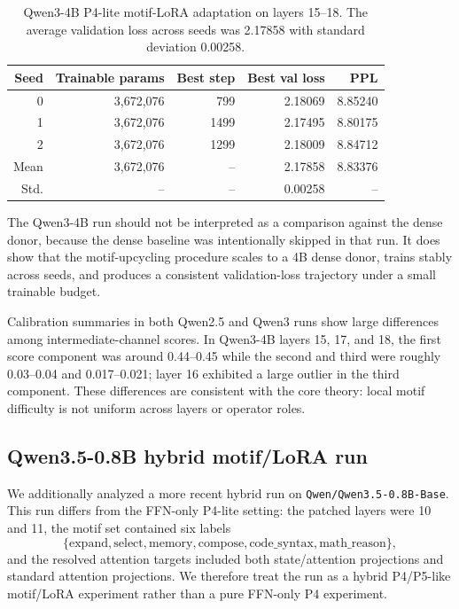 \documentclass[11pt]{article}
\theoremstyle{definition}
\begin{document}
\begin{table}[h]
\centering
\small
\begin{tabular}{rrrrr}
\toprule
Seed & Trainable params & Best step & Best val loss & PPL \\
\midrule
0 & 3,672,076 & 799 & 2.18069 & 8.85240 \\
1 & 3,672,076 & 1499 & 2.17495 & 8.80175 \\
2 & 3,672,076 & 1299 & 2.18009 & 8.84712 \\
\midrule
Mean & 3,672,076 & -- & 2.17858 & 8.83376 \\
Std. & -- & -- & 0.00258 & -- \\
\bottomrule
\end{tabular}
\caption{Qwen3-4B P4-lite motif-LoRA adaptation on layers 15--18. The average validation loss across seeds was 2.17858 with standard deviation 0.00258.}
\label{tab:qwen3}
\end{table}

The Qwen3-4B run should not be interpreted as a comparison against the dense donor, because the dense baseline was intentionally skipped in that run. It does show that the motif-upcycling procedure scales to a 4B dense donor, trains stably across seeds, and produces a consistent validation-loss trajectory under a small trainable budget.

Calibration summaries in both Qwen2.5 and Qwen3 runs show large differences among intermediate-channel scores. In Qwen3-4B layers 15, 17, and 18, the first score component was around 0.44--0.45 while the second and third were roughly 0.03--0.04 and 0.017--0.021; layer 16 exhibited a large outlier in the third component. These differences are consistent with the core theory: local motif difficulty is not uniform across layers or operator roles.


\subsection{Qwen3.5-0.8B hybrid motif/LoRA run}

We additionally analyzed a more recent hybrid run on \texttt{Qwen/Qwen3.5-0.8B-Base}. This run differs from the FFN-only P4-lite setting: the patched layers were 10 and 11, the motif set contained six labels
\[
\{\mathrm{expand},\mathrm{select},\mathrm{memory},\mathrm{compose},\mathrm{code\_syntax},\mathrm{math\_reason}\},
\]
and the resolved attention targets included both state/attention projections and standard attention projections. We therefore treat the run as a hybrid P4/P5-like motif/LoRA experiment rather than a pure FFN-only P4 experiment.
\end{document}
